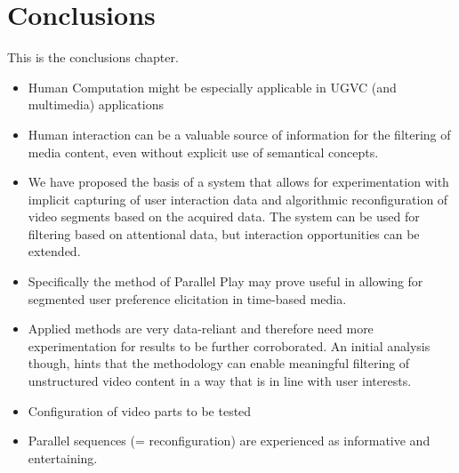 \chapter{Conclusions}
\label{chapter:conclusions}
 

This is the conclusions chapter.

\begin{itemize}
  \item Human Computation might be especially applicable in UGVC (and multimedia) applications
  \item Human interaction can be a valuable source of information for the filtering of media content, even without explicit use of semantical concepts.
  \item We have proposed the basis of a system that allows for experimentation with implicit capturing of user interaction data and algorithmic reconfiguration of video segments based on the acquired data. The system can be used for filtering based on attentional data, but interaction opportunities can be extended.
  \item Specifically the method of Parallel Play may prove useful in allowing for segmented user preference elicitation in time-based media.
  \item Applied methods are very data-reliant and therefore need more experimentation for results to be further corroborated. An initial analysis though, hints that the methodology can enable meaningful filtering of unstructured video content in a way that is in line with user interests.
  \item Configuration of video parts to be tested
  \item Parallel sequences (= reconfiguration) are experienced as informative and entertaining.
\end{itemize}

